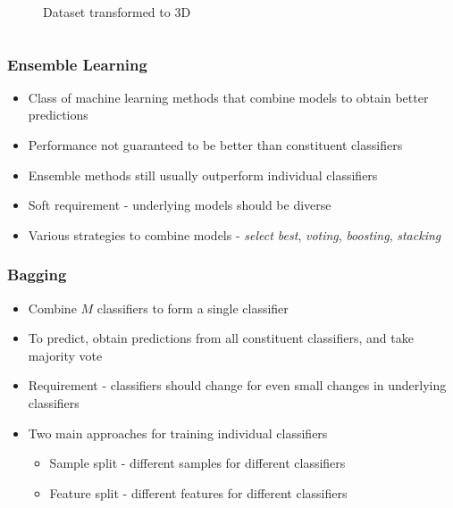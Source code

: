 \documentclass{beamer}
\begin{document}
\begin{frame}
\begin{columns}
\begin{column}{0.4\textwidth}
\begin{figure}
                    \caption{Dataset transformed to 3D}
                \end{figure}
            \end{column}
        \end{columns}
    \end{frame}
    
    \begin{frame}
        \frametitle{Ensemble Learning}
        \begin{itemize}
            \item{Class of machine learning methods that combine models to obtain better predictions}
            \item{Performance not guaranteed to be better than constituent classifiers}
            \item{Ensemble methods still usually outperform individual classifiers}
            \item{Soft requirement - underlying models should be diverse}
            \item{Various strategies to combine models - \emph{select best}, \emph{voting}, \emph{boosting}, \emph{stacking}}
        \end{itemize}
    \end{frame}
    
    \begin{frame}
        \frametitle{Bagging}
        \begin{itemize}
            \item{Combine $M$ classifiers to form a single classifier}
            \item{To predict, obtain predictions from all constituent classifiers, and take majority vote}
            \item{Requirement - classifiers should change for even small changes in underlying classifiers}
            \item{
            Two main approaches for training individual classifiers
            \begin{itemize}
                \item{Sample split - different samples for different classifiers}
                \item{Feature split - different features for different classifiers}
            \end{itemize}
            }
        \end{itemize}
    \end{frame}
    
\end{document}
